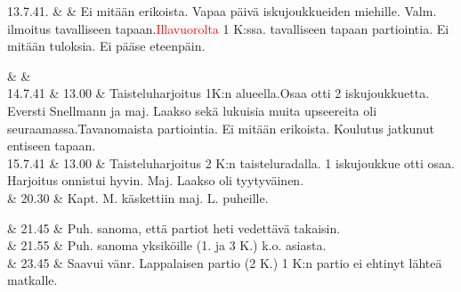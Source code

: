 \documentclass[11pt,a5paper,oneside]{book}
\begin{document}
13.7.41. & & Ei mitään erikoista. Vapaa päivä iskujoukkueiden miehille. Valm. ilmoitus tavalliseen tapaan.\newline \textcolor{red}{Illavuorolta} 1 K:ssa. tavalliseen tapaan partiointia. Ei mitään tuloksia. Ei pääse eteenpäin. \\
\newpage

& & \newline\newline\newline\newline \\

14.7.41 & 13.00 & Taisteluharjoitus 1K:n alueella.\newline Osaa otti 2 iskujoukkuetta. \newline Eversti Snellmann ja maj. Laakso sekä lukuisia muita upseereita oli seuraamassa.\newline Tavanomaista partiointia. Ei mitään erikoista. Koulutus jatkunut entiseen tapaan. \newline\newline\newline\newline\newline \\

15.7.41 & 13.00 & Taisteluharjoitus 2 K:n taisteluradalla. 1 iskujoukkue otti osaa. Harjoitus onnistui hyvin. Maj. Laakso oli tyytyväinen.\newline \\ 

& 20.30 & Kapt. M. käskettiin maj. L. puheille. \\

\taulustop


& 21.45 & Puh. sanoma, että partiot heti vedettävä takaisin. \\

& 21.55 & Puh. sanoma yksiköille (1. ja 3 K.) k.o. asiasta. \\

& 23.45 & Saavui vänr. Lappalaisen partio (2 K.) 1 K:n partio ei ehtinyt lähteä matkalle. \newline\newline\newline\newline\newline \\
\end{document}
